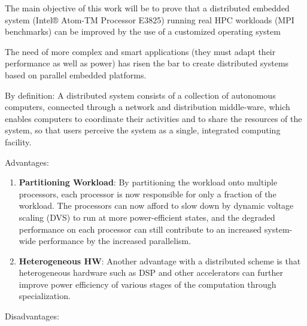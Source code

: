 The main objective of this work will be to prove that a distributed embedded
system (Intel® Atom-TM Processor E3825) running real HPC workloads 
(MPI benchmarks) can be improved by the use of a customized operating system 



The need of more complex and smart applications (they must adapt their
performance as well as power) has risen the bar to create distributed systems
based on parallel embedded platforms. 

By definition: A distributed system consists of a collection of autonomous
computers, connected through a network and distribution middle-ware, which
enables computers to coordinate their activities and to share the resources of
the system, so that users perceive the system as a single, integrated computing
facility.

Advantages: 

\begin{enumerate} 
    
    \item \textbf{Partitioning Workload}: 
    By partitioning the workload onto multiple processors, 
    each processor is now responsible for only a fraction of the workload. 
    The processors can now afford to slow down by dynamic voltage scaling 
    (DVS) to run at more power-efficient states, and the degraded performance 
    on each processor can still contribute to an increased system-wide 
    performance by the increased parallelism.  

    \item \textbf{Heterogeneous HW}: 
    Another advantage with a distributed scheme is that heterogeneous hardware 
    such as DSP and other accelerators can further improve power efficiency 
    of various stages of the computation through specialization.

\end{enumerate}
 

Disadvantages: 

